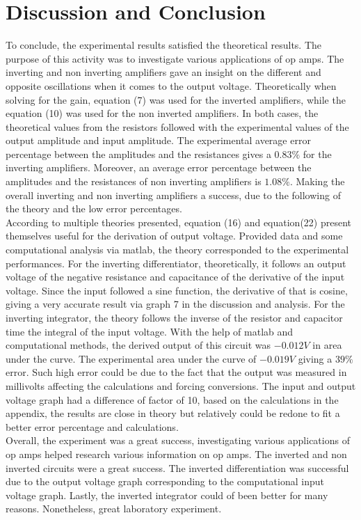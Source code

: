 \documentclass[11pt]{article}
\begin{document}
\section*{Discussion and Conclusion}
To conclude, the experimental results satisfied the theoretical results. The purpose of this activity was to investigate various applications of op amps. The inverting and non inverting amplifiers gave an insight on the different and opposite oscillations when it comes to the output voltage. Theoretically when solving for the gain, equation (7) was used for the inverted amplifiers, while the equation (10) was used for the non inverted amplifiers. In both cases, the theoretical values from the resistors followed with the experimental values of the output amplitude and input amplitude. The experimental average error percentage between the amplitudes and the resistances gives a $0.83\%$ for the inverting amplifiers. Moreover, an average error percentage between the amplitudes and the resistances of non inverting amplifiers is $1.08\%$. Making the overall inverting and non inverting amplifiers a success, due to the following of the theory and the low error percentages.\\
According to multiple theories presented, equation (16) and equation(22) present themselves useful for the derivation of output voltage. Provided data and some computational analysis via matlab, the theory corresponded to the experimental performances. For the inverting differentiator, theoretically, it follows an output voltage of the negative resistance and capacitance of the derivative of the input voltage. Since the input followed a sine function, the derivative of that is cosine, giving a very accurate result via graph 7 in the discussion and analysis. For the inverting integrator, the theory follows the inverse of the resistor and capacitor time the integral of the input voltage. With the help of matlab and computational methods, the derived output of this circuit was $-0.012V$ in area under the curve. The experimental area under the curve of $-0.019V$ giving a $39\%$ error. Such high error could be due to the fact that the output was measured in millivolts affecting the calculations and forcing conversions. The input and output voltage graph had a difference of factor of 10, based on the calculations in the appendix, the results are close in theory but relatively could be redone to fit a better error percentage and calculations.\\
Overall, the experiment was a great success, investigating various applications of op amps helped research various information on op amps. The inverted and non inverted circuits were a great success. The inverted differentiation was successful due to the output voltage graph corresponding to the computational input voltage graph. Lastly, the inverted integrator could of been better for many reasons. Nonetheless, great laboratory experiment.
\end{document}
